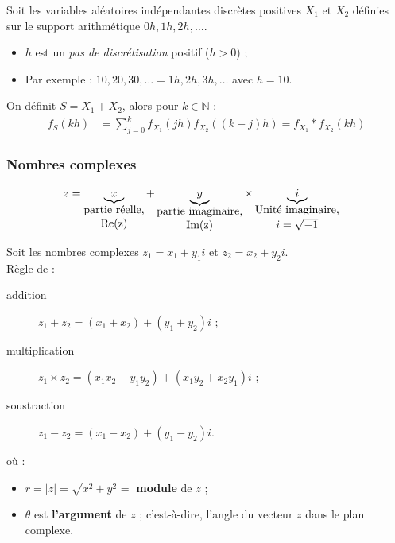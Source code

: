\documentclass[10pt, french]{article}
\begin{document}
\begin{multicols*}{2}
\begin{rappel_enhanced}
\tcbline

Soit les variables aléatoires indépendantes discrètes positives $X_{1}$ et $X_{2}$ définies sur le support arithmétique $0h, 1h, 2h, \dots$.
\begin{itemize}
	\item	$h$ est un \og \textit{pas de discrétisation} \fg{} positif ($h > 0$) ;
	\item	Par exemple : $10, 20, 30, \ldots  = 1h, 2h, 3h, \dots$ avec $h = 10$.
\end{itemize}

On définit $S	=	X_{1} + X_{2}$, alors pour $k \in \mathbb{N}$ :
\begin{align*}
	f_{S}(kh)
	&=	\sum_{j = 0}^{k} f_{X_{1}}(jh) f_{X_{2}}((k - j)h) 
	=	f_{X_{1}} \ast f_{X_{2}}(kh)
\end{align*}
\end{rappel_enhanced}

\subsubsection{Nombres complexes}
\begin{align*}
	z	&=	\underbrace{x}_{\shortstack{partie réelle,\\ \text{Re}(z)}} + \underbrace{y}_{\shortstack{partie imaginaire,\\ \text{Im}(z)}}\times\underbrace{i}_{\shortstack{Unité imaginaire,\\ $i = \sqrt{-1}$}}
\end{align*}

\begin{definitionNOHFILLpropos}
Soit les nombres complexes $z_{1}	=	x_{1} + y_{1}i$ et $z_{2}	=	x_{2} + y_{2}i$.\\
Règle de : 
\begin{description}
	\item[addition]	$z_{1} + z_{2}	=	(x_{1} + x_{2}) + (y_{1} + y_{2})i$ ;
	\item[multiplication]	$z_{1} \times z_{2}	=	(x_{1}x_{2} - y_{1}y_{2}) + (x_{1}y_{2} + x_{2}y_{1})i$ ;
	\item[soustraction]		$z_{1} - z_{2}	=	(x_{1} - x_{2}) + (y_{1} - y_{2})i$.
\end{description}
\end{definitionNOHFILLpropos}


\begin{definitionNOHFILLprop}
 où : 
\begin{itemize}
	\item	$r	=	|z|	=	\sqrt{x^{2} + y^{2}}	=$ \textbf{module} de $z$ ;
	\item	$\theta$	est \textbf{l'argument} de $z$ ; c'est-à-dire, l'angle du vecteur $z$ dans le plan complexe.
\end{itemize}
\end{definitionNOHFILLprop}


\end{multicols*}
\end{document}
